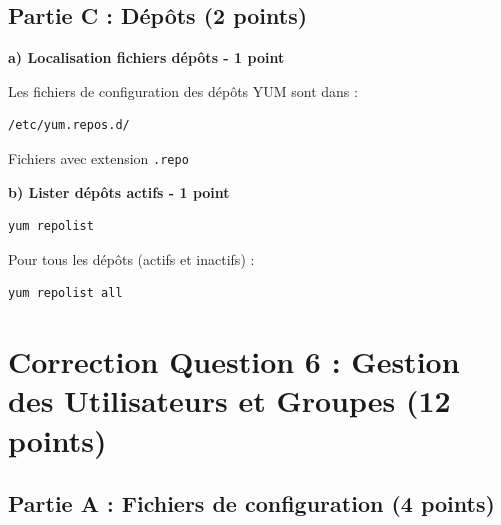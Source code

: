 \documentclass[12pt,a4paper]{article}
\begin{document}
\subsection*{Partie C : Dépôts (2 points)}

\begin{answerbox}
\textbf{a) Localisation fichiers dépôts - 1 point}

Les fichiers de configuration des dépôts YUM sont dans :
\begin{lstlisting}
/etc/yum.repos.d/
\end{lstlisting}

Fichiers avec extension \texttt{.repo}

\textbf{b) Lister dépôts actifs - 1 point}

\begin{lstlisting}
yum repolist
\end{lstlisting}

Pour tous les dépôts (actifs et inactifs) :
\begin{lstlisting}
yum repolist all
\end{lstlisting}
\end{answerbox}

\newpage


\section{Correction Question 6 : Gestion des Utilisateurs et Groupes (12 points)}

\subsection*{Partie A : Fichiers de configuration (4 points)}
\end{document}

